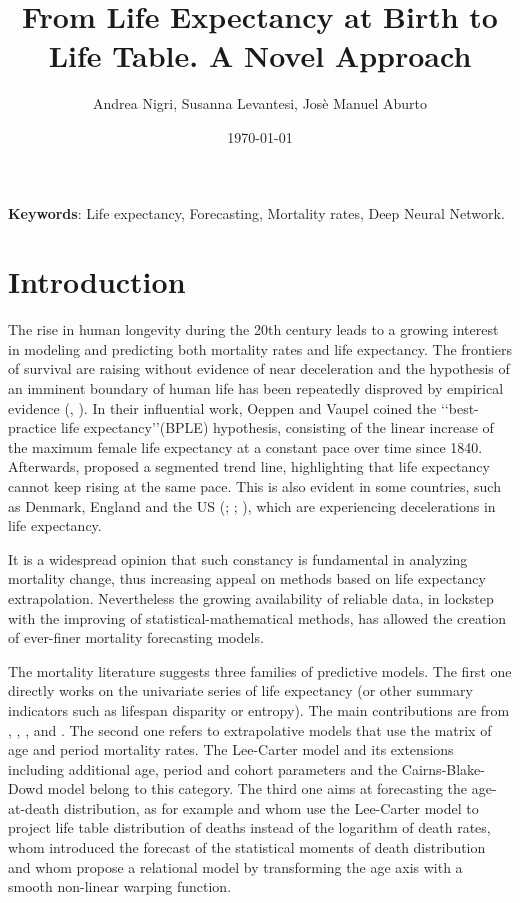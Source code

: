 \documentclass[a4,11pt]{article}
\title{From Life Expectancy at Birth to Life Table. A Novel Approach}
\author{Andrea Nigri, Susanna Levantesi, Josè Manuel Aburto}
\date{\today}
\begin{document}
	\maketitle
	\bigskip
	\begin{flushleft}
		\textbf{Keywords}: Life expectancy, Forecasting, Mortality rates, Deep Neural Network.
	\end{flushleft}
	
\section{Introduction}
The rise in human longevity during the 20th century leads to a growing interest in modeling and predicting both mortality rates and life expectancy.
The frontiers of survival are raising without evidence of near deceleration and the hypothesis of an imminent boundary of human life has been repeatedly disproved by empirical evidence (\cite{HM}, \cite{OV2002}). In their influential work, Oeppen and Vaupel coined the \lq\lq best-practice life expectancy\rq\rq (BPLE) hypothesis, consisting of the linear increase of the maximum female life expectancy at a constant pace over time since 1840. Afterwards, \citet{Vallin} proposed a segmented trend line, highlighting that life expectancy cannot keep rising at the same pace. This is also evident in some countries, such as Denmark, England and the US (\cite{Aburto2018}; \cite{Hiam}; \cite{Ho}), which are experiencing decelerations in life expectancy.

It is a widespread opinion that such constancy is fundamental in analyzing mortality change, thus increasing appeal on methods based on life expectancy extrapolation. Nevertheless the growing availability of reliable data, in lockstep with the improving of statistical-mathematical methods, has allowed the creation of ever-finer mortality forecasting models.

The mortality literature suggests three families of predictive models. The first one directly works on the univariate series of life expectancy (or other summary indicators such as lifespan disparity or entropy). The main contributions are from \cite{Lee2006}, \cite{TorriVaupel12}, \cite{Raftery13}, \cite{Pascariu18} and \cite{Nigri19}.
The second one refers to extrapolative models that use the matrix of age and period mortality rates. The Lee-Carter model \citep{LC1992} and its extensions including additional age, period and cohort parameters and the Cairns-Blake-Dowd model \citep{CBD2006} belong to this category.
The third one aims at forecasting the age-at-death distribution, as for example \cite{Oeppen08} and \cite{Bergeron} whom use the Lee-Carter model to project life table distribution of deaths instead of the logarithm of death rates, \cite{Pascariu19} whom introduced the forecast of the statistical moments of death distribution and \cite{BaselliniCamarda} whom propose a relational model by transforming the age axis with a smooth non-linear warping function. 
\end{document}
